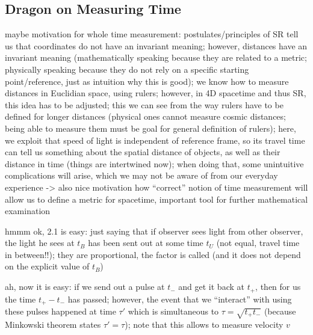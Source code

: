 		\subsection{Dragon on Measuring Time}
maybe motivation for whole time measurement: postulates/principles of SR tell us that coordinates do not have an invariant meaning; however, distances have an invariant meaning (mathematically speaking because they are related to a metric; physically speaking because they do not rely on a specific starting point/reference, just as intuition why this is good); we know how to measure distances in Euclidian space, using rulers; however, in 4D spacetime and thus SR, this idea has to be adjusted; this we can see from the way rulers have to be defined for longer distances (physical ones cannot measure cosmic distances; being able to measure them must be goal for general definition of rulers); here, we exploit that speed of light is independent of reference frame, so its travel time can tell us something about the spatial distance of objects, as well as their distance in time (things are intertwined now); when doing that, some unintuitive complications will arise, which we may not be aware of from our everyday experience -> also nice motivation how \enquote{correct} notion of time measurement will allow us to define a metric for spacetime, important tool for further mathematical examination



hmmm ok, 2.1 is easy: just saying that if observer sees light from other observer, the light he sees at $t_B$ has been sent out at some time $t_U$ (not equal, travel time in between!!); they are proportional, the factor is called  (and it does not depend on the explicit value of $t_B$)


ah, now it is easy: if we send out a pulse at $t_-$ and get it back at $t_+$, then for us the time $t_+ - t_-$ has passed; however, the event that we \enquote{interact} with using these pulses happened at time $\tau'$ which is simultaneous to $\tau = \sqrt{t_+ t_-}$ (because Minkowski theorem states $\tau' = \tau$); note that this allows to measure velocity $v$


